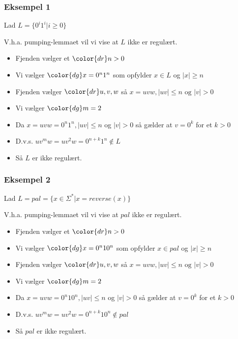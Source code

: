 \begin{frame}
\frametitle{Eksempel 1}
Lad $L = \{0^i1^i | i \geq 0 \}$

V.h.a. pumping-lemmaet vil vi vise at $L$ ikke er regulært.
\begin{itemize}[<+->]
\item Fjenden vælger et ${\color{dr}n}> 0$
\item Vi vælger  ${\color{dg}x=0^n1^n}$ som opfylder $x\in L$ og $|x|\geq n$
\item Fjenden vælger ${\color{dr}u,v,w}$ så $x=uvw, |uv|\leq n \text{ og } |v| > 0$
\item Vi vælger ${\color{dg}m=2}$
\item Da $x = uvw=0^n1^n, |uv|\leq n$ og $|v|>0$ så gælder at $v=0^k$ for et $k>0$
\item D.v.s. $uv^mw = uv^2w=0^{n+k}1^n \not\in L$
\item Så $L$ er \alert{ikke} regulært.
\end{itemize}
\end{frame}

\begin{frame}
\frametitle{Eksempel 2}
Lad $L = pal = \{x\in\Sigma^* | x=reverse(x) \}$

V.h.a. pumping-lemmaet vil vi vise at $pal$ ikke er regulært.

\begin{itemize}[<+->]
\item Fjenden vælger et ${\color{dr}n}> 0$
\item Vi vælger  ${\color{dg}x=0^n10^n}$ som opfylder $x\in pal$ og $|x|\geq n$
\item Fjenden vælger ${\color{dr}u,v,w}$ så $x=uvw, |uv|\leq n \text{ og } |v| > 0$
\item Vi vælger ${\color{dg}m=2}$
\item Da $x = uvw=0^n10^n, |uv|\leq n$ og $|v|>0$ så gælder at $v=0^k$ for et $k>0$
\item D.v.s. $uv^mw = uv^2w=0^{n+k}10^n \not\in pal$
\item Så $pal$ er \alert{ikke} regulært.
\end{itemize}
\end{frame}

